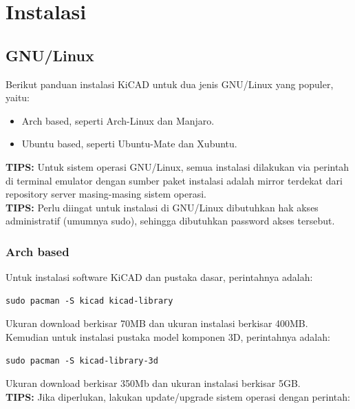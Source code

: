 \documentclass[12pt]{book}
\begin{document}
	\newpage
	\section{Instalasi}

	\subsection{GNU/Linux}

	Berikut panduan instalasi KiCAD untuk dua jenis GNU/Linux yang populer, yaitu:
	\begin{itemize}
		\item Arch based, seperti Arch-Linux dan Manjaro.
		\item Ubuntu based, seperti Ubuntu-Mate dan Xubuntu.
	\end{itemize}

	\textbf{TIPS:} Untuk sistem operasi GNU/Linux, semua instalasi dilakukan via perintah di
	terminal emulator dengan sumber paket instalasi adalah mirror terdekat dari repository server masing-masing sistem operasi.\\

	\textbf{TIPS:} Perlu diingat untuk instalasi di GNU/Linux dibutuhkan hak akses administratif (umumnya sudo),
	sehingga dibutuhkan password akses tersebut.

	\subsubsection{Arch based}

	Untuk instalasi software KiCAD dan pustaka dasar, perintahnya adalah:

	\begin{lstlisting}
sudo pacman -S kicad kicad-library
	\end{lstlisting}

	Ukuran download berkisar 70MB dan ukuran instalasi berkisar 400MB.\\

	Kemudian untuk instalasi pustaka model komponen 3D, perintahnya adalah:

	\begin{lstlisting}
sudo pacman -S kicad-library-3d
	\end{lstlisting}

	Ukuran download berkisar 350Mb dan ukuran instalasi berkisar 5GB.\\

	\textbf{TIPS:} Jika diperlukan, lakukan update/upgrade sistem operasi dengan perintah:
\end{document}
